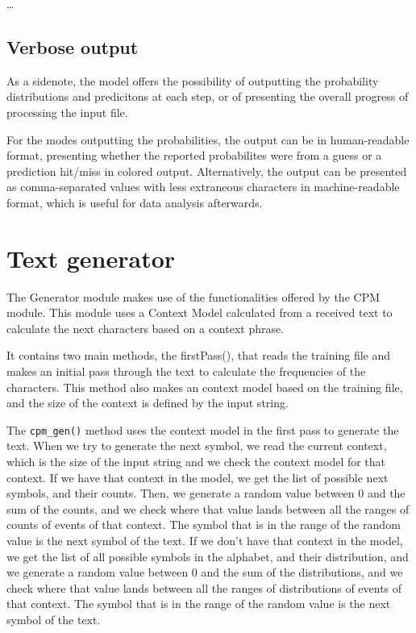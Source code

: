 \documentclass{article}
\begin{document}
\dots

\subsection{Verbose output}

As a sidenote, the model offers the possibility of outputting the probability distributions and predicitons at each step, or of presenting the overall progress of processing the input file.

For the modes outputting the probabilities, the output can be in human-readable format, presenting whether the reported probabilites were from a guess or a prediction hit/miss in colored output.
Alternatively, the output can be presented as comma-separated values with less extraneous characters in machine-readable format, which is useful for data analysis afterwards.


\section{Text generator}
\label{sec:text-generator}

The Generator module makes use of the functionalities offered by the CPM module.
This module uses a Context Model calculated from a received text to calculate the
next characters based on a context phrase. 

It contains two main methods, the firstPass(), that reads the training file and makes an initial pass through the text to calculate the frequencies of the characters.
This method also makes an context model based on the training file, and the size of the context is defined by the input string. 

The \verb|cpm_gen()| method uses the context model in the first pass to generate the text.
When we try to generate the next symbol, we read the current context, which is the size of the input string and we check the context model for that context. If we have that context in the model, we get the list of possible next symbols, and their counts. Then, we generate a random value between 0 and the sum of the counts, and we check where that value lands between all the ranges of counts of events of that context. The symbol that is in the range of the random value is the next symbol of the text.
If we don't have that context in the model, we get the list of all possible symbols in the alphabet, and their distribution, and we generate a random value between 0 and the sum of the distributions, and we check where that value lands between all the ranges of distributions of events of that context. The symbol that is in the range of the random value is the next symbol of the text. 
\end{document}
